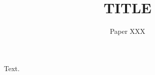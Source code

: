 \documentclass{aamas2016}
\begin{document}
\title{TITLE}




 \author{
 \alignauthor
 Paper XXX}



\maketitle
%





Text.
\end{document}
